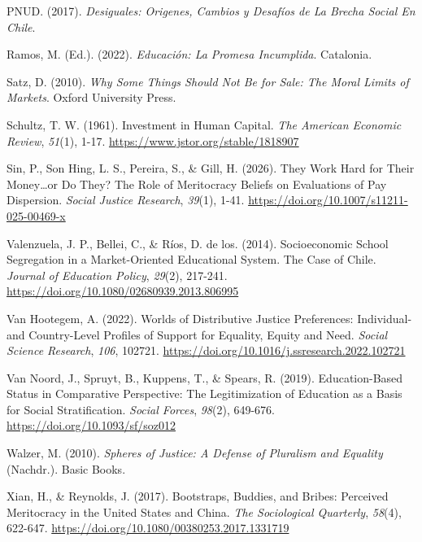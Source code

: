 \documentclass[
  spanish,
  a4paper,
  oneside]{scrbook}
\newlength{\cslhangindent}
\newenvironment{CSLReferences}[2] %
 {\begin{list}{}{%
  \setlength{\itemindent}{0pt}
  \setlength{\leftmargin}{0pt}
  \setlength{\parsep}{0pt}
  \ifodd #1
   \setlength{\leftmargin}{\cslhangindent}
   \setlength{\itemindent}{-1\cslhangindent}
  \fi
  \setlength{\itemsep}{#2\baselineskip}}}
 {\end{list}}
\begin{document}
\begin{CSLReferences}{1}{0}
PNUD. (2017). \emph{Desiguales: Origenes, Cambios y Desafíos de La
Brecha Social En Chile}.

Ramos, M. (Ed.). (2022). \emph{Educación: La Promesa Incumplida}.
Catalonia.

Satz, D. (2010). \emph{Why Some Things Should Not Be for Sale: The Moral
Limits of Markets}. Oxford University Press.

Schultz, T. W. (1961). Investment in Human Capital. \emph{The American
Economic Review}, \emph{51}(1), 1-17.
\url{https://www.jstor.org/stable/1818907}

Sin, P., Son Hing, L. S., Pereira, S., \& Gill, H. (2026). They Work
Hard for Their Money\ldots or Do They? The Role of Meritocracy Beliefs
on Evaluations of Pay Dispersion. \emph{Social Justice Research},
\emph{39}(1), 1-41. \url{https://doi.org/10.1007/s11211-025-00469-x}

Valenzuela, J. P., Bellei, C., \& Ríos, D. de los. (2014). Socioeconomic
School Segregation in a Market-Oriented Educational System. The Case of
Chile. \emph{Journal of Education Policy}, \emph{29}(2), 217-241.
\url{https://doi.org/10.1080/02680939.2013.806995}

Van Hootegem, A. (2022). Worlds of Distributive Justice Preferences:
Individual- and Country-Level Profiles of Support for Equality, Equity
and Need. \emph{Social Science Research}, \emph{106}, 102721.
\url{https://doi.org/10.1016/j.ssresearch.2022.102721}

Van Noord, J., Spruyt, B., Kuppens, T., \& Spears, R. (2019).
Education-Based Status in Comparative Perspective: The Legitimization of
Education as a Basis for Social Stratification. \emph{Social Forces},
\emph{98}(2), 649-676. \url{https://doi.org/10.1093/sf/soz012}

Walzer, M. (2010). \emph{Spheres of Justice: A Defense of Pluralism and
Equality} (Nachdr.). Basic Books.

Xian, H., \& Reynolds, J. (2017). Bootstraps, Buddies, and Bribes:
Perceived Meritocracy in the United States and China. \emph{The
Sociological Quarterly}, \emph{58}(4), 622-647.
\url{https://doi.org/10.1080/00380253.2017.1331719}


\end{CSLReferences}
\end{document}
